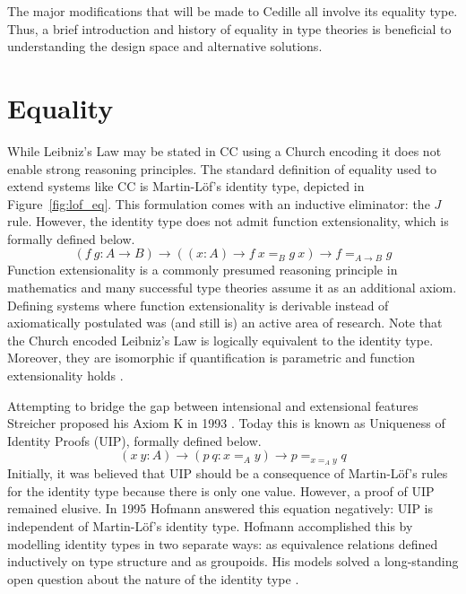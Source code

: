 The major modifications that will be made to Cedille all involve its equality type.
Thus, a brief introduction and history of equality in type theories is beneficial to understanding the design space and alternative solutions.

\section{Equality}



While Leibniz's Law may be stated in CC using a Church encoding it does not enable strong reasoning principles.
The standard definition of equality used to extend systems like CC is Martin-L\"{o}f's identity type, depicted in Figure~\ref{fig:lof_eq}.
This formulation comes with an inductive eliminator: the $J$ rule.
However, the identity type does not admit function extensionality, which is formally defined below.
$$(f\ g : A \to B) \to ((x : A) \to f\ x =_B g\ x) \to f =_{A \to B} g$$
Function extensionality is a commonly presumed reasoning principle in mathematics and many successful type theories assume it as an additional axiom.
Defining systems where function extensionality is derivable instead of axiomatically postulated was (and still is) an active area of research.
Note that the Church encoded Leibniz's Law is logically equivalent to the identity type.
Moreover, they are isomorphic if quantification is parametric and function extensionality holds \cite{abel2020_equality}.

Attempting to bridge the gap between intensional and extensional features Streicher proposed his Axiom K in 1993 \cite{streicher1993}.
Today this is known as Uniqueness of Identity Proofs (UIP), formally defined below.
$$(x\ y : A) \to (p\ q : x =_A y) \to p =_{x =_A y} q$$
Initially, it was believed that UIP should be a consequence of Martin-L\"{o}f's rules for the identity type because there is only one value.
However, a proof of UIP remained elusive.
In 1995 Hofmann answered this equation negatively: UIP is independent of Martin-L\"{o}f's identity type.
Hofmann accomplished this by modelling identity types in two separate ways: as equivalence relations defined inductively on type structure and as groupoids.
His models solved a long-standing open question about the nature of the identity type \cite{hofmann1995, hofmann1996}.

